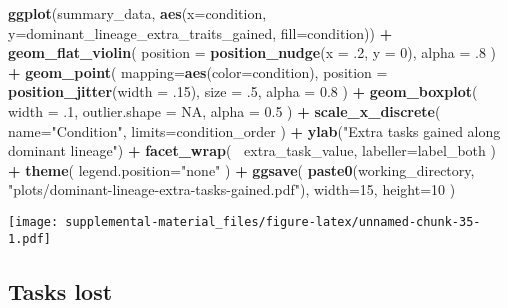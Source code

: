 \documentclass[]{book}
\newenvironment{Shaded}{\begin{snugshade}}{\end{snugshade}}
\newcommand{\DataTypeTok}[1]{\textcolor[rgb]{0.13,0.29,0.53}{#1}}
\newcommand{\DecValTok}[1]{\textcolor[rgb]{0.00,0.00,0.81}{#1}}
\newcommand{\FloatTok}[1]{\textcolor[rgb]{0.00,0.00,0.81}{#1}}
\newcommand{\KeywordTok}[1]{\textcolor[rgb]{0.13,0.29,0.53}{\textbf{#1}}}
\newcommand{\NormalTok}[1]{#1}
\newcommand{\OperatorTok}[1]{\textcolor[rgb]{0.81,0.36,0.00}{\textbf{#1}}}
\newcommand{\OtherTok}[1]{\textcolor[rgb]{0.56,0.35,0.01}{#1}}
\newcommand{\StringTok}[1]{\textcolor[rgb]{0.31,0.60,0.02}{#1}}
\begin{document}
\begin{Shaded}
\begin{Highlighting}[]
\KeywordTok{ggplot}\NormalTok{(summary_data, }\KeywordTok{aes}\NormalTok{(}\DataTypeTok{x=}\NormalTok{condition, }\DataTypeTok{y=}\NormalTok{dominant_lineage_extra_traits_gained, }\DataTypeTok{fill=}\NormalTok{condition)) }\OperatorTok{+}
\StringTok{  }\KeywordTok{geom_flat_violin}\NormalTok{(}
    \DataTypeTok{position =} \KeywordTok{position_nudge}\NormalTok{(}\DataTypeTok{x =} \FloatTok{.2}\NormalTok{, }\DataTypeTok{y =} \DecValTok{0}\NormalTok{),}
    \DataTypeTok{alpha =} \FloatTok{.8}
\NormalTok{  ) }\OperatorTok{+}
\StringTok{  }\KeywordTok{geom_point}\NormalTok{(}
    \DataTypeTok{mapping=}\KeywordTok{aes}\NormalTok{(}\DataTypeTok{color=}\NormalTok{condition),}
    \DataTypeTok{position =} \KeywordTok{position_jitter}\NormalTok{(}\DataTypeTok{width =} \FloatTok{.15}\NormalTok{),}
    \DataTypeTok{size =} \FloatTok{.5}\NormalTok{,}
    \DataTypeTok{alpha =} \FloatTok{0.8}
\NormalTok{  ) }\OperatorTok{+}
\StringTok{  }\KeywordTok{geom_boxplot}\NormalTok{(}
    \DataTypeTok{width =} \FloatTok{.1}\NormalTok{,}
    \DataTypeTok{outlier.shape =} \OtherTok{NA}\NormalTok{,}
    \DataTypeTok{alpha =} \FloatTok{0.5}
\NormalTok{  ) }\OperatorTok{+}
\StringTok{  }\KeywordTok{scale_x_discrete}\NormalTok{(}
    \DataTypeTok{name=}\StringTok{"Condition"}\NormalTok{,}
    \DataTypeTok{limits=}\NormalTok{condition_order}
\NormalTok{  ) }\OperatorTok{+}
\StringTok{  }\KeywordTok{ylab}\NormalTok{(}\StringTok{"Extra tasks gained along dominant lineage"}\NormalTok{) }\OperatorTok{+}
\StringTok{  }\KeywordTok{facet_wrap}\NormalTok{(}
    \OperatorTok{~}\NormalTok{extra_task_value,}
    \DataTypeTok{labeller=}\NormalTok{label_both}
\NormalTok{  ) }\OperatorTok{+}
\StringTok{  }\KeywordTok{theme}\NormalTok{(}
    \DataTypeTok{legend.position=}\StringTok{"none"}
\NormalTok{  ) }\OperatorTok{+}
\StringTok{  }\KeywordTok{ggsave}\NormalTok{(}
    \KeywordTok{paste0}\NormalTok{(working_directory, }\StringTok{"plots/dominant-lineage-extra-tasks-gained.pdf"}\NormalTok{),}
    \DataTypeTok{width=}\DecValTok{15}\NormalTok{,}
    \DataTypeTok{height=}\DecValTok{10}
\NormalTok{  )}
\end{Highlighting}
\end{Shaded}

\texttt{[image: supplemental-material\_files/figure-latex/unnamed-chunk-35-1.pdf]}

\hypertarget{tasks-lost}{%
\subsection{Tasks lost}\label{tasks-lost}}
\end{document}
